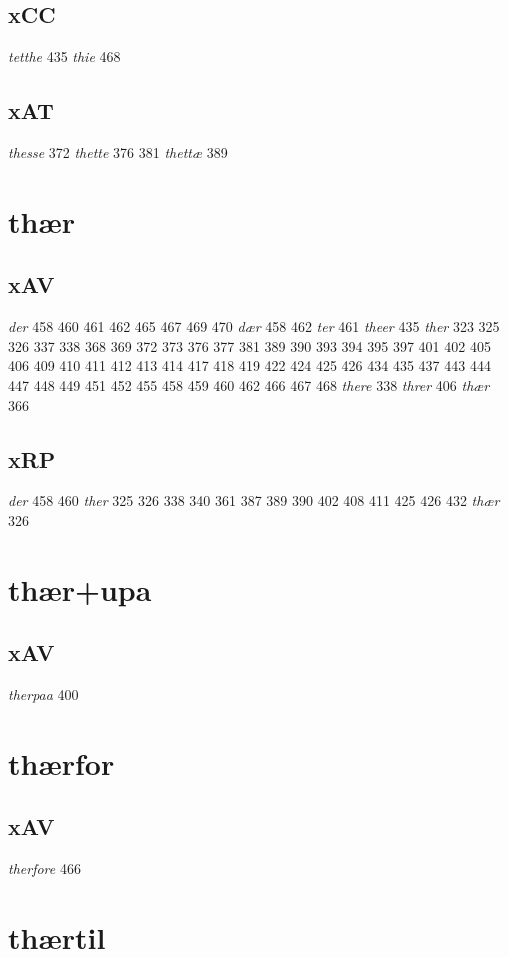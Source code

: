 \documentclass[a4paper,twocolumn]{article}
\begin{document}
\subsection{xCC}
\label{sec:orgbda5b64}
\emph{tetthe} 435 \emph{thie} 468 
\subsection{xAT}
\label{sec:orgc50cb9f}
\emph{thesse} 372 \emph{thette} 376 381 \emph{thettæ} 389 
\section{thær}
\label{sec:org2f66bf5}
\subsection{xAV}
\label{sec:orgeea9d0c}
\emph{der} 458 460 461 462 465 467 469 470 \emph{dær} 458 462 \emph{ter} 461 \emph{theer} 435 \emph{ther} 323 325 326 337 338 368 369 372 373 376 377 381 389 390 393 394 395 397 401 402 405 406 409 410 411 412 413 414 417 418 419 422 424 425 426 434 435 437 443 444 447 448 449 451 452 455 458 459 460 462 466 467 468 \emph{there} 338 \emph{threr} 406 \emph{thær} 366 
\subsection{xRP}
\label{sec:org5694f84}
\emph{der} 458 460 \emph{ther} 325 326 338 340 361 387 389 390 402 408 411 425 426 432 \emph{thær} 326 
\section{thær+upa}
\label{sec:orge6f979d}
\subsection{xAV}
\label{sec:org4834bc7}
\emph{therpaa} 400 
\section{thærfor}
\label{sec:org3948dc8}
\subsection{xAV}
\label{sec:org0effb00}
\emph{therfore} 466 
\section{thærtil}
\label{sec:org5266752}
\end{document}
